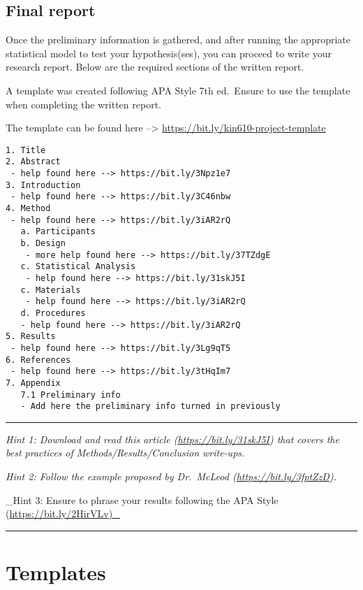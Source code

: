 \documentclass[
]{article}
\begin{document}
\hypertarget{final-report}{%
\subsection{Final report}\label{final-report}}

Once the preliminary information is gathered, and after running the appropriate statistical model to test your hypothesis(ses), you can proceed to write your research report. Below are the required sections of the written report.

A template was created following APA Style 7th ed.~Ensure to use the template when completing the written report.

The template can be found here --\textgreater{} \url{https://bit.ly/kin610-project-template}

\begin{verbatim}
1. Title
2. Abstract
 - help found here --> https://bit.ly/3Npz1e7
3. Introduction
 - help found here --> https://bit.ly/3C46nbw
4. Method 
 - help found here --> https://bit.ly/3iAR2rQ
   a. Participants
   b. Design
    - more help found here --> https://bit.ly/37TZdgE
   c. Statistical Analysis
    - help found here --> https://bit.ly/31skJ5I 
   c. Materials
    - help found here --> https://bit.ly/3iAR2rQ
   d. Procedures
   - help found here --> https://bit.ly/3iAR2rQ
5. Results
 - help found here --> https://bit.ly/3Lg9qT5
6. References
 - help found here --> https://bit.ly/3tHqIm7
7. Appendix
   7.1 Preliminary info
   - Add here the preliminary info turned in previously
\end{verbatim}

\begin{center}\rule{0.5\linewidth}{0.5pt}\end{center}

\emph{Hint 1: Download and read this article (\url{https://bit.ly/31skJ5I}) that covers the best practices of Methods/Results/Conclusion write-ups.}

\emph{Hint 2: Follow the example proposed by Dr.~McLeod (\url{https://bit.ly/3fptZzD}).}

\_Hint 3: Ensure to phrase your results following the APA Style (\url{https://bit.ly/2HirVLv)_}

\begin{center}\rule{0.5\linewidth}{0.5pt}\end{center}

\hypertarget{templates}{%
\section{Templates}\label{templates}}
\end{document}
